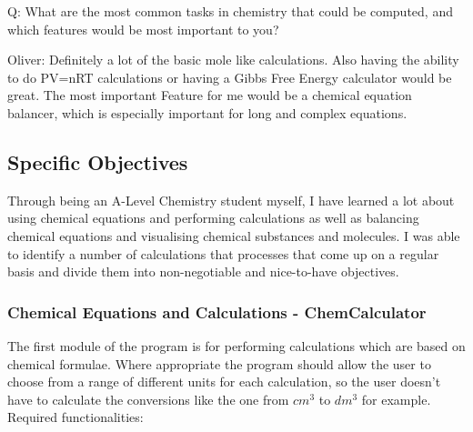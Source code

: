\documentclass[a4paper,12pt]{article}
\begin{document}
\newpage
Q: What are the most common tasks in chemistry that could be computed, and which features would be most important to you?\\
\linebreak

Oliver: Definitely a lot of the basic mole like calculations. Also having the ability to do PV=nRT calculations or having a Gibbs Free Energy calculator would be great. The most important Feature for me would be a chemical equation balancer, which is especially important for long and complex equations.


\subsection{Specific Objectives}

Through being an A-Level Chemistry student myself, I have learned a lot about using chemical equations and performing calculations as well as balancing chemical equations and visualising chemical substances and molecules. I was able to identify a number of calculations that processes that come up on a regular basis and divide them into non-negotiable and nice-to-have objectives.

\subsubsection{Chemical Equations and Calculations - ChemCalculator}

The first module of the program is for performing  calculations which are based on chemical formulae.
Where appropriate the program should allow the user to choose from a range of different units for each calculation, so the user doesn't have to calculate the conversions like the one from $cm^{3}$ to $dm^{3}$ for example.\\
\linebreak
Required functionalities:\\
\linebreak
\end{document}
